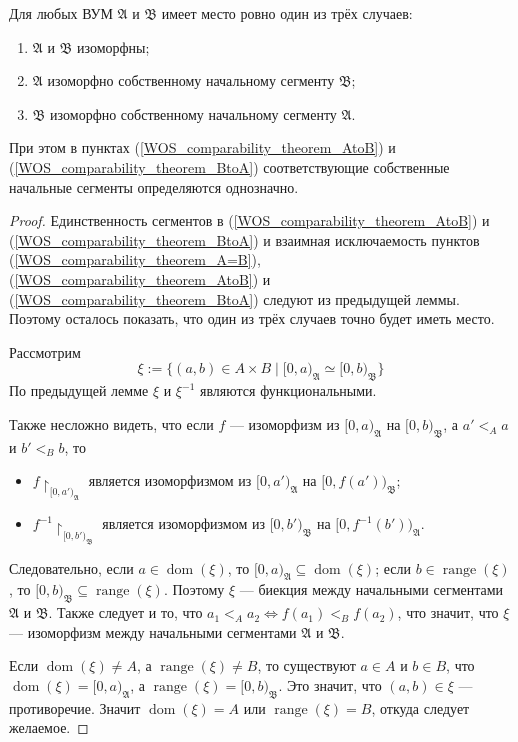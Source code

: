 \documentclass[12pt,a4paper]{article}
\DeclareMathOperator{\dom}{dom}
\DeclareMathOperator{\range}{range}
\begin{document}
    \begin{theorem}
        Для любых ВУМ $\mathfrak{A}$ и $\mathfrak{B}$ имеет место ровно один из трёх случаев:
        \begin{enumerate}
            \item \label{WOS_comparability_theorem_A=B} $\mathfrak{A}$ и $\mathfrak{B}$ изоморфны;
            \item \label{WOS_comparability_theorem_AtoB} $\mathfrak{A}$ изоморфно собственному начальному сегменту $\mathfrak{B}$;
            \item \label{WOS_comparability_theorem_BtoA} $\mathfrak{B}$ изоморфно собственному начальному сегменту $\mathfrak{A}$.
        \end{enumerate}

        При этом в пунктах (\ref{WOS_comparability_theorem_AtoB}) и (\ref{WOS_comparability_theorem_BtoA}) соответствующие собственные начальные сегменты определяются однозначно.
    \end{theorem}

    \begin{proof}
        Единственность сегментов в (\ref{WOS_comparability_theorem_AtoB}) и (\ref{WOS_comparability_theorem_BtoA}) и взаимная исключаемость пунктов (\ref{WOS_comparability_theorem_A=B}), (\ref{WOS_comparability_theorem_AtoB}) и (\ref{WOS_comparability_theorem_BtoA}) следуют из предыдущей леммы. Поэтому осталось показать, что один из трёх случаев точно будет иметь место.

        Рассмотрим
        \[\xi := \{(a, b) \in A \times B \mid [0, a)_\mathfrak{A} \simeq [0, b)_\mathfrak{B}\}\]
        По предыдущей лемме $\xi$ и $\xi^{-1}$ являются функциональными.

        Также несложно видеть, что если $f$ --- изоморфизм из $[0, a)_\mathfrak{A}$ на $[0, b)_\mathfrak{B}$, а $a' <_A a$ и $b' <_B b$, то
        \begin{itemize}
            \item $f\upharpoonright_{[0, a')_\mathfrak{A}}$ является изоморфизмом из $[0, a')_\mathfrak{A}$ на $[0, f(a'))_\mathfrak{B}$;
            \item $f^{-1}\upharpoonright_{[0, b')_\mathfrak{B}}$ является изоморфизмом из $[0, b')_\mathfrak{B}$ на $[0, f^{-1}(b'))_\mathfrak{A}$.
        \end{itemize}
        Следовательно, если $a \in \dom(\xi)$, то $[0, a)_\mathfrak{A} \subseteq \dom(\xi)$; если $b \in \range(\xi)$, то $[0, b)_\mathfrak{B} \subseteq \range(\xi)$. Поэтому $\xi$ --- биекция между начальными сегментами $\mathfrak{A}$ и $\mathfrak{B}$. Также следует и то, что $a_1 <_A a_2 \Leftrightarrow f(a_1) <_B f(a_2)$, что значит, что $\xi$ --- изоморфизм между начальными сегментами $\mathfrak{A}$ и $\mathfrak{B}$.

        Если $\dom(\xi) \neq A$, а $\range(\xi) \neq B$, то существуют $a \in A$ и $b \in B$, что $\dom(\xi) = [0, a)_\mathfrak{A}$, а $\range(\xi) = [0, b)_\mathfrak{B}$. Это значит, что $(a, b) \in \xi$ --- противоречие. Значит $\dom(\xi) = A$ или $\range(\xi) = B$, откуда следует желаемое.
    \end{proof}

    
\end{document}
